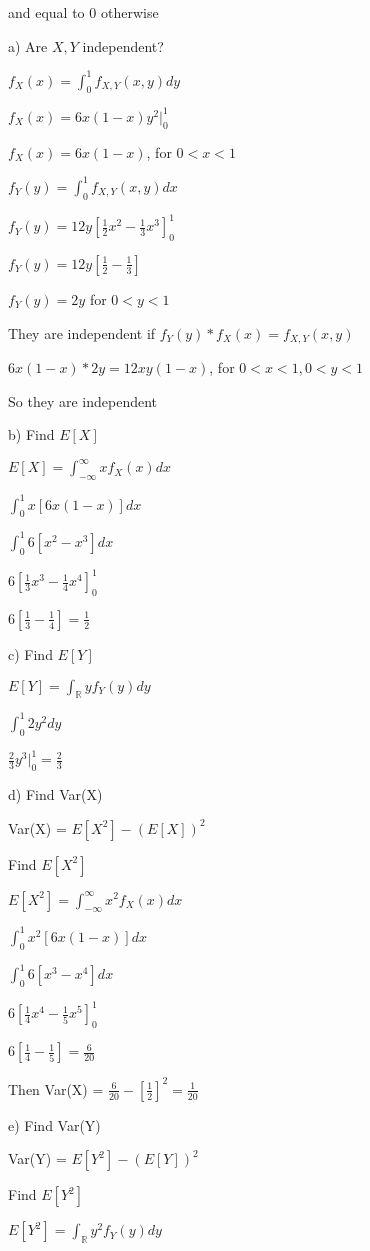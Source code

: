 \documentclass[11pt]{article}
\begin{document}
\begin{itemize}
and equal to 0 otherwise

a) Are $X,Y$ independent?

$f_X(x) = \int_0^1 f_{X,Y}(x,y) dy$

$f_X(x) = 6x(1-x)y^2|_0^1$

$f_X(x) = 6x(1-x)$, for $0 < x < 1$

$f_Y(y) = \int_0^1 f_{X,Y}(x,y) dx$

$f_Y(y) = 12y[\frac{1}{2}x^2 - \frac{1}{3}x^3]_0^1$

$f_Y(y) = 12y[\frac{1}{2} - \frac{1}{3}]$

$f_Y(y) = 2y$ for $0 < y < 1$

They are independent if $f_Y(y) * f_X(x) = f_{X,Y}(x,y)$

$6x(1-x)*2y = 12xy(1-x)$, for $0< x < 1, 0 < y < 1$

So they are independent

b) Find $E[X]$

$E[X] = \int_{-\infty}^{\infty} x f_X(x) dx$

$\int_{0}^{1} x[6x(1-x)]dx$

$\int_{0}^{1} 6[x^2-x^3]dx$

$6[\frac{1}{3}x^3 - \frac{1}{4}x^4]_0^1$

$6[\frac{1}{3} - \frac{1}{4}] = \frac{1}{2}$

c) Find $E[Y]$

$E[Y] = \int_{\mathbb{R}} y f_Y(y) dy$

$\int_0^1 2y^2 dy$

$\frac{2}{3}y^3 |_0^1 = \frac{2}{3}$

d) Find Var(X)

Var(X) = $E[X^2] - (E[X])^2$

Find $E[X^2]$

$E[X^2] = \int_{-\infty}^{\infty} x^2 f_X(x) dx$

$\int_{0}^{1} x^2[6x(1-x)]dx$

$\int_{0}^{1} 6[x^3 - x^4]dx$

$6[\frac{1}{4}x^4 - \frac{1}{5}x^5]_0^1$

$6[\frac{1}{4} - \frac{1}{5}] = \frac{6}{20}$

Then Var(X) = $\frac{6}{20} - [\frac{1}{2}]^2 = \frac{1}{20}$

e) Find Var(Y)

Var(Y) = $E[Y^2] - (E[Y])^2$

Find $E[Y^2]$

$E[Y^2] = \int_{\mathbb{R}} y^2 f_Y(y) dy$


\end{itemize}
\end{document}
